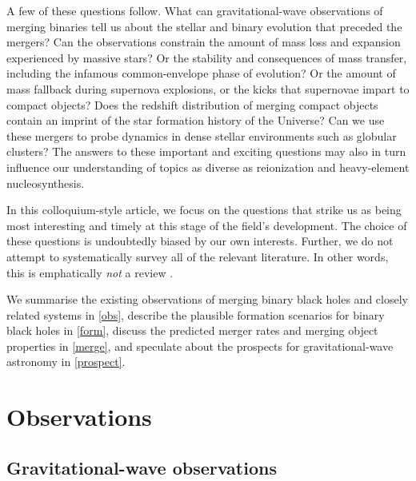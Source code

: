 \documentclass[iop,onecolumn]{revtex4}
\begin{document}
A few of these questions follow. What can gravitational-wave observations of merging binaries tell us about the stellar and binary evolution that preceded the mergers?  Can the observations constrain the amount of mass loss and expansion experienced by massive stars? Or the stability and consequences of mass transfer, including the infamous common-envelope phase of evolution? Or the amount of mass fallback during supernova explosions, or the kicks that supernovae impart to compact objects? Does the redshift distribution of merging compact objects contain an imprint of the star formation history of the Universe?  Can we use these mergers to probe dynamics in dense stellar environments such as globular clusters? The answers to these important and exciting questions may also in turn influence our understanding of topics as diverse as reionization and heavy-element nucleosynthesis.

In this colloquium-style article, we focus on the questions that strike us as being most interesting and timely at this stage of the field's development.  The choice of these questions is undoubtedly biased by our own interests. Further, we do not attempt to systematically survey all of the relevant literature.  In other words, this is emphatically {\it not} a review \citep{magritte}. 

We summarise the existing observations of merging binary black holes and closely related systems in \autoref{obs}, describe the plausible formation scenarios for binary black holes in \autoref{form}, discuss the predicted merger rates and merging object properties in \autoref{merge}, and speculate about the prospects for gravitational-wave astronomy in \autoref{prospect}.


 

\section{Observations}\label{obs}

\subsection{Gravitational-wave observations}
\end{document}

